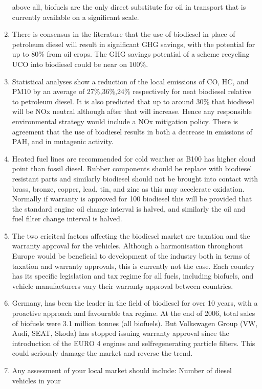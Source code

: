\documentclass[11pt,fleqn]{book} %
\begin{document}
\begin{enumerate}
	above all, biofuels are the only direct substitute for oil in transport that is currently
	available on a significant scale.
	\item There is consensus in the literature that the use of biodiesel in place of petroleum diesel
	will result in significant GHG savings, with the potential for up to 80\% from oil crops. The
	GHG savings potential of a scheme recycling UCO into biodiesel could be near on 100\%.
	\item Statistical analyses show a reduction of the local emissions of CO, HC, and PM10 by an
	average of 27\%,36\%,24\% respectively for neat biodiesel relative to petroleum diesel. It is
	also predicted that up to around 30\% that biodiesel will be NOx neutral although after that
	will increase. Hence any responsible environmental strategy would include a NOx
	mitigation policy. There is agreement that the use of biodiesel results in both a decrease
	in emissions of PAH, and in mutagenic activity.
	\item Heated fuel lines are recommended for cold weather as B100 has higher cloud point than
	fossil diesel. Rubber components should be replace with biodiesel resistant parts and
	similarly biodiesel should not be brought into contact with brass, bronze, copper, lead, tin,
	and zinc as this may accelerate oxidation. Normally if warranty is approved for 100%
	biodiesel this will be provided that the standard engine oil change interval is halved, and
	similarly the oil and fuel filter change interval is halved.
	\item The two cricitcal factors affecting the biodiesel market are taxation and the warranty
	approval for the vehicles. Although a harmonisation throughout Europe would be
	beneficial to development of the industry both in terms of taxation and warranty
	approvals, this is currently not the case. Each country has its specific legislation and tax
	regime for all fuels, including biofuels, and vehicle manufacturers vary their warranty
	approval between countries.
	\item Germany, has been the leader in the field of biodiesel for over 10 years, with a proactive
	approach and favourable tax regime. At the end of 2006, total sales of biofuels were 3.1
	million tonnes (all biofuels). But Volkswagen Group (VW, Audi, SEAT, Skoda) has
	stopped issuing warranty approval since the introduction of the EURO 4 engines and selfregenerating
	particle filters. This could seriously damage the market and reverse the
	trend.
	\item Any assessment of your local market should include: Number of diesel vehicles in your

\end{enumerate}
\end{document}
